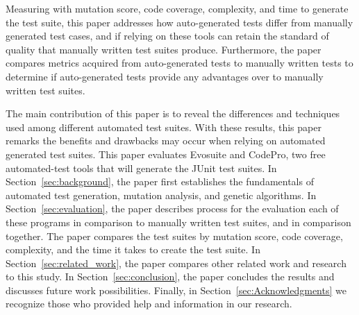 Measuring with mutation score, code coverage, complexity, and time to generate the test suite, this paper addresses how auto-generated tests differ from manually generated test cases, and if relying on these tools can retain the standard of quality that manually written test suites produce. Furthermore, the paper compares metrics acquired from auto-generated tests to manually written tests to determine if auto-generated tests provide any advantages over to manually written test suites.

The main contribution of this paper is to reveal the differences and techniques used among different automated test suites. With these results, this paper remarks the benefits and drawbacks may occur when relying on automated generated test suites. This paper evaluates Evosuite and CodePro, two free automated-test tools that will generate the JUnit test suites. In Section~\ref{sec:background}, the paper first establishes the fundamentals of automated test generation, mutation analysis, and genetic algorithms. In Section~\ref{sec:evaluation}, the paper describes process for the evaluation each of these programs in comparison to manually written test suites, and in comparison together. The paper compares the test suites by mutation score, code coverage, complexity, and the time it takes to create the test suite. In Section~\ref{sec:related_work}, the paper compares other related work and research to this study. In Section~\ref{sec:conclusion}, the paper concludes the results and discusses future work possibilities. Finally, in Section~\ref{sec:Acknowledgments} we recognize those who provided help and information in our research.
